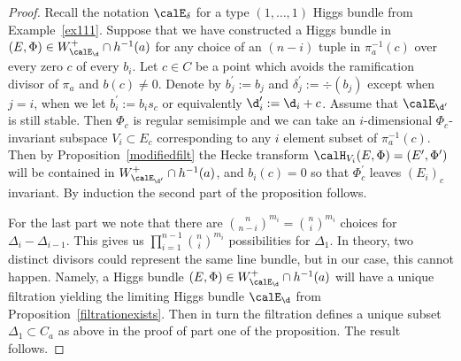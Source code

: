 \begin{proof}
	Recall the notation $\calE_{\delta}$ for a type $(1,\dots,1)$ Higgs bundle from Example~\ref{ex111}. Suppose  that we have constructed a Higgs bundle in $(E,\Phi)\in W^+_{\calE_{\d}}\cap h^{-1}(a)$ for any choice of an $(n-i)$ tuple in $\pi_a^{-1}(c)$ over every zero $c$ of every $b_i$. Let $c\in C$ be a point which avoids the ramification divisor of $\pi_a$ and $b(c)\neq 0$. Denote by $b^\prime_j:=b_j$ and $\delta_j^\prime:=\div(b_j)$ except when $j=i$,  when we let $b^\prime_i:=b_i s_c$ or equivalently $\d^\prime_i:=\d_i+c$. Assume that $\calE_{\d^\prime}$ is still stable.  Then $\Phi_c$ is regular semisimple and we can take an $i$-dimensional $\Phi_c$-invariant subspace $V_i\subset E_c$ corresponding to any $i$ element subset of $\pi_a^{-1}(c)$. Then by Proposition~\ref{modifiedfilt} the Hecke transform  $\calH_{V_i}(E,\Phi)=(E^\prime,\Phi^\prime)$ will be contained in $W^+_{\calE_{\d^\prime}}\cap h^{-1}(a)$, and $b_i(c)=0$ so that $\Phi^\prime_c$ leaves $(E_i)_c$ invariant. By induction the second part of the proposition follows.

	For the last part we note that there are ${n\choose n-i}^{m_i}={n\choose i}^{m_i}$ choices for $\Delta_i-\Delta_{i-1}$. 	This gives us $\prod_{i=1}^{n-1}{n \choose i}^{m_i}$ possibilities for $\Delta_1$.  In theory, two distinct divisors could represent the same line bundle, but in our case, this cannot happen. Namely, a Higgs bundle $(E,\Phi) \in W^+_{\calE_{\d}}\cap h^{-1}(a)$ will have a unique filtration yielding the limiting Higgs bundle $\calE_{\d}$ from Proposition~\ref{filtrationexists}. Then in turn the  filtration  defines a unique subset $\Delta_1\subset C_a$ as above in the proof of part one of the proposition. The result follows.




\end{proof}

